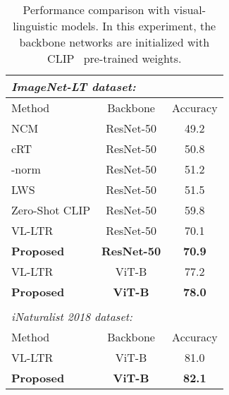 \documentclass{article}
\theoremstyle{plain}
\theoremstyle{definition}
\theoremstyle{remark}
\begin{document}
\begin{table}[t]
\centering
\caption{Performance comparison with visual-linguistic models. In this experiment, the backbone networks are initialized with CLIP~\cite{radford2021learning} pre-trained weights.}
\begin{tabular}{lcc}
\multicolumn{3}{l}{\textit{ImageNet-LT dataset:}}                                                                 \\ \hline
\multicolumn{1}{l|}{Method}                             & \multicolumn{1}{c|}{Backbone}           & Accuracy      \\ \hline
\multicolumn{1}{l|}{NCM}             & \multicolumn{1}{c|}{ResNet-50}          & 49.2          \\
\multicolumn{1}{l|}{cRT}             & \multicolumn{1}{c|}{ResNet-50}          & 50.8          \\
\multicolumn{1}{l|}{-norm}     & \multicolumn{1}{c|}{ResNet-50}          & 51.2          \\
\multicolumn{1}{l|}{LWS}             & \multicolumn{1}{c|}{ResNet-50}          & 51.5          \\
\multicolumn{1}{l|}{Zero-Shot CLIP} & \multicolumn{1}{c|}{ResNet-50}          & 59.8          \\
\multicolumn{1}{l|}{VL-LTR}                  & \multicolumn{1}{c|}{ResNet-50}          & 70.1          \\
\multicolumn{1}{l|}{\textbf{Proposed}}                  & \multicolumn{1}{c|}{\textbf{ResNet-50}} & \textbf{70.9} \\ \hline
\multicolumn{1}{l|}{VL-LTR}                  & \multicolumn{1}{c|}{ViT-B}              & 77.2          \\
\multicolumn{1}{l|}{\textbf{Proposed}}                  & \multicolumn{1}{c|}{\textbf{ViT-B}}     & \textbf{78.0} \\ \hline
\\
\multicolumn{3}{l}{\textit{iNaturalist 2018 dataset:}}                                                            \\ \hline
\multicolumn{1}{l|}{Method}                             & \multicolumn{1}{c|}{Backbone}           & Accuracy      \\ \hline
\multicolumn{1}{l|}{VL-LTR}                  & \multicolumn{1}{c|}{ViT-B}              & 81.0          \\
\multicolumn{1}{l|}{\textbf{Proposed}}                  & \multicolumn{1}{c|}{\textbf{ViT-B}}     & \textbf{82.1} \\ \hline
\end{tabular}

%
 \label{tab:vl_ltr}
\end{table}
\end{document}
